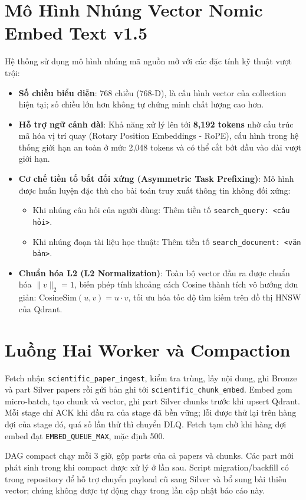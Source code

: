 \section{Mô Hình Nhúng Vector Nomic Embed Text v1.5}

Hệ thống sử dụng mô hình nhúng mã nguồn mở \textbf{} với các đặc tính kỹ thuật vượt trội:
\begin{itemize}
  \item \textbf{Số chiều biểu diễn}: 768 chiều (768-D), là cấu hình vector của collection hiện tại; số chiều lớn hơn không tự chứng minh chất lượng cao hơn.
  \item \textbf{Hỗ trợ ngữ cảnh dài}: Khả năng xử lý lên tới \textbf{8,192 tokens} nhờ cấu trúc mã hóa vị trí quay (Rotary Position Embeddings - RoPE), cấu hình trong hệ thống giới hạn an toàn ở mức 2,048 tokens và có thể cắt bớt đầu vào dài vượt giới hạn.
  \item \textbf{Cơ chế tiền tố bất đối xứng (Asymmetric Task Prefixing)}: Mô hình được huấn luyện đặc thù cho bài toán truy xuất thông tin không đối xứng:
    \begin{itemize}
      \item Khi nhúng câu hỏi của người dùng: Thêm tiền tố \texttt{search\_query: <câu hỏi>}.
      \item Khi nhúng đoạn tài liệu học thuật: Thêm tiền tố \texttt{search\_document: <văn bản>}.
    \end{itemize}
  \item \textbf{Chuẩn hóa L2 (L2 Normalization)}: Toàn bộ vector đầu ra được chuẩn hóa $\|v\|_2 = 1$, biến phép tính khoảng cách Cosine thành tích vô hướng đơn giản: $\text{CosineSim}(u, v) = u \cdot v$, tối ưu hóa tốc độ tìm kiếm trên đồ thị HNSW của Qdrant.
\end{itemize}

\section{Luồng Hai Worker và Compaction}
Fetch nhận \texttt{scientific\_paper\_ingest}, kiểm tra trùng, lấy nội dung, ghi Bronze và part Silver papers rồi gửi bản ghi tới \texttt{scientific\_chunk\_embed}. Embed gom micro-batch, tạo chunk và vector, ghi part Silver chunks trước khi upsert Qdrant. Mỗi stage chỉ ACK khi đầu ra của stage đã bền vững; lỗi được thử lại trên hàng đợi của stage đó, quá số lần thử thì chuyển DLQ. Fetch tạm chờ khi hàng đợi embed đạt \texttt{EMBED\_QUEUE\_MAX}, mặc định 500.

DAG compact chạy mỗi 3 giờ, gộp parts của cả papers và chunks. Các part mới phát sinh trong khi compact được xử lý ở lần sau. Script migration/backfill có trong repository để hỗ trợ chuyển payload cũ sang Silver và bổ sung bài thiếu vector; chúng không được tự động chạy trong lần cập nhật báo cáo này.
